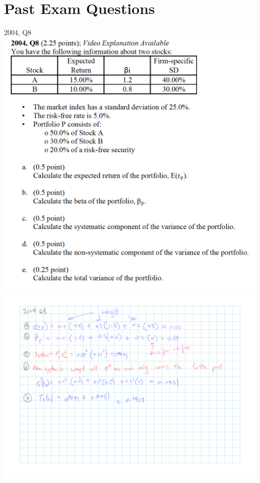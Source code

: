 \documentclass[]{book}
\theoremstyle{definition}
\theoremstyle{definition}
\theoremstyle{remark}
\begin{document}
\section{Past Exam Questions}\label{past-exam-questions-2}

 2004, Q8 \includegraphics{Section A/questions/2004-8Q.png}
\includegraphics{Section A/questions/2004-8A.png}
\end{document}
